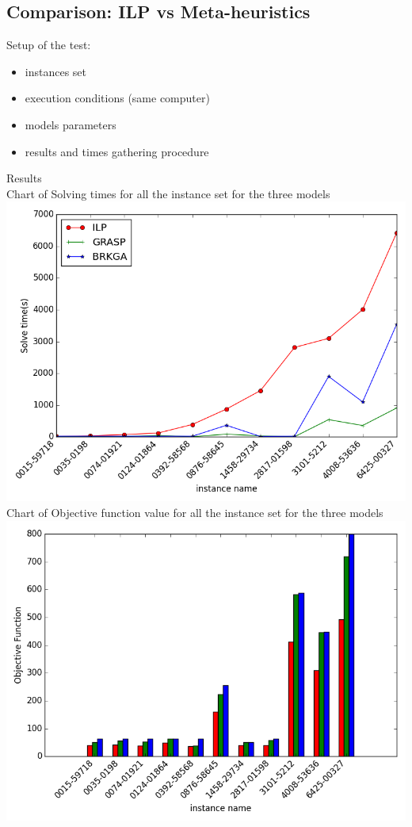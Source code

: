 \subsection{Comparison: ILP vs Meta-heuristics}

Setup of the test:\\
\begin{itemize}
	\item instances set
	\item execution conditions (same computer)
	\item models parameters
	\item results and times gathering procedure
\end{itemize}

Results\\
Chart of Solving times for all the instance set for the three models\\

\includegraphics[width=1\textwidth]{./img/ILPvsMetah_times.png}\\[0.8cm] 


Chart of Objective function value for all the instance set for the three models\\


\includegraphics[width=1\textwidth]{./img/ILPvsMetah_objf.png}\\[0.8cm] 




\pagebreak